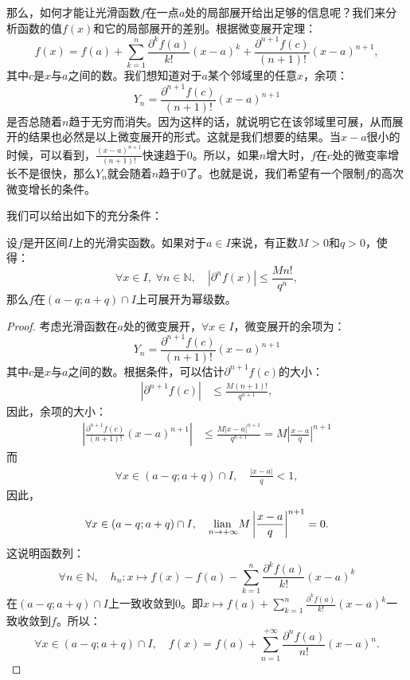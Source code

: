 \documentclass[12pt,UTF8]{ctexbook}
\begin{document}
\begin{appendix}
那么，如何才能让光滑函数$f$在一点$a$处的局部展开给出足够的信息呢？我们来分析函数的值$f(x)$和它的局部展开的差别。根据微变展开定理：
$$ f(x) = f(a) + \sum_{k=1}^n \frac{\partial^k f (a)}{k!}(x - a)^k + \frac{\partial^{n+1} f (c)}{(n+1)!}(x - a)^{n+1}, $$
其中$c$是$x$与$a$之间的数。我们想知道对于$a$某个邻域里的任意$x$，余项：
$$ Y_n = \frac{\partial^{n+1} f (c)}{(n+1)!}(x - a)^{n+1} $$
是否总随着$n$趋于无穷而消失。因为这样的话，就说明它在该邻域里可展，从而展开的结果也必然是以上微变展开的形式。这就是我们想要的结果。当$x - a$很小的时候，可以看到，$\frac{(x - a)^{n+1}}{(n+1)!}$快速趋于$0$。所以，如果$n$增大时，$f$在$c$处的微变率增长不是很快，那么$Y_n$就会随着$n$趋于$0$了。也就是说，我们希望有一个限制$f$的高次微变增长的条件。

我们可以给出如下的充分条件：
\begin{tm}\label{tm:c-5-10}
    设$f$是开区间$I$上的光滑实函数。如果对于$a\in I$来说，有正数$M>0$和$q>0$，使得：
    $$ \forall x \in I, \; \forall n \in \mathbb{N},\quad |\partial^n f (x)| \leqslant \frac{M n!}{q^n}, $$
    那么$f$在$(a-q;a+q)\cap I$上可展开为幂级数。
\end{tm}

\begin{proof}
    考虑光滑函数在$a$处的微变展开，$\forall x \in I$，微变展开的余项为：
    $$ Y_n = \frac{\partial^{n+1} f (c)}{(n+1)!}(x - a)^{n+1} $$
    其中$c$是$x$与$a$之间的数。根据条件，可以估计$\partial^{n+1} f (c)$的大小：
    \begin{align*}
        |\partial^{n+1} f (c)| &\leqslant \frac{M (n+1)!}{q^{n+1}},
    \end{align*}
    因此，余项的大小：
    \begin{align*}
        \left|\frac{\partial^{n+1} f (c)}{(n+1)!}(x - a)^{n+1}\right| &\leqslant \frac{M |x - a|^{n+1}}{q^{n+1}} = M\left|\frac{x - a}{q}\right|^{n+1}
    \end{align*}
    而
    \begin{align*}
        \forall x\in(a-q;a+q)\cap I, \quad \frac{|x - a|}{q} < 1,
    \end{align*}
    因此，
    $$ \forall x\in(a-q;a+q)\cap I, \quad  \underset{n\to +\infty}{\operatorname{lian}\,}M\left|\frac{x - a}{q}\right|^{n+1} = 0. $$
    这说明函数列：
    $$ \forall n\in\mathbb{N}, \quad h_n: x\mapsto f(x) - f(a) - \sum_{k=1}^n \frac{\partial^k f (a)}{k!}(x - a)^k $$
    在$(a-q;a+q)\cap I$上一致收敛到$0$。即$\displaystyle x\mapsto f(a) + \sum_{k=1}^n \frac{\partial^k f (a)}{k!}(x - a)^k$一致收敛到$f$。所以：
    $$ \forall x\in (a-q;a+q)\cap I,\quad f(x) = f(a) + \sum_{n=1}^{+\infty} \frac{\partial^n f (a)}{n!}(x - a)^n. $$
\end{proof}


\end{appendix}
\end{document}

